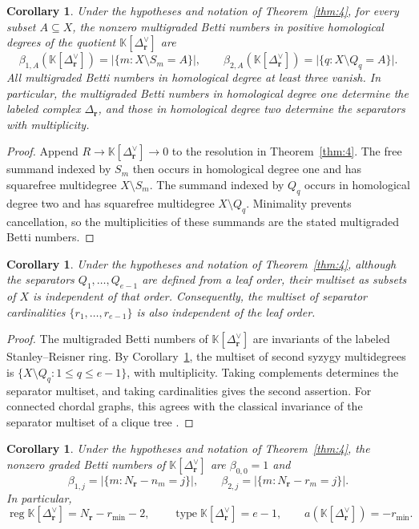 \documentclass[11pt]{amsart}
\newtheorem{corollary}[theorem]{Corollary}
\theoremstyle{definition}
\theoremstyle{remark}
\newcommand{\K}{\mathbb K}
\newcommand{\SR}[1]{\K[#1]}
\DeclareMathOperator{\reg}{reg}
\begin{document}
	\begin{corollary}\label{cor:7}
		Under the hypotheses and notation of Theorem~\ref{thm:4}, for every subset $A\subseteq X$, the nonzero multigraded Betti numbers in positive homological degrees of the quotient $\SR{\Delta_{\mathbf r}^\vee}$ are
		\[
		\beta_{1,A}(\SR{\Delta_{\mathbf r}^\vee})
		=
		\bigl|\{m:X\setminus S_m=A\}\bigr|,
		\qquad
		\beta_{2,A}(\SR{\Delta_{\mathbf r}^\vee})
		=
		\bigl|\{q:X\setminus Q_q=A\}\bigr|.
		\]
		All multigraded Betti numbers in homological degree at least three vanish. In particular, the multigraded Betti numbers in homological degree one determine the labeled complex $\Delta_{\mathbf r}$, and those in homological degree two determine the separators with multiplicity.
	\end{corollary}
	
	\begin{proof}
		Append $R\to\SR{\Delta_{\mathbf r}^\vee}\to0$ to the resolution in Theorem~\ref{thm:4}. The free summand indexed by $S_m$ then occurs in homological degree one and has squarefree multidegree $X\setminus S_m$. The summand indexed by $Q_q$ occurs in homological degree two and has squarefree multidegree $X\setminus Q_q$. Minimality prevents cancellation, so the multiplicities of these summands are the stated multigraded Betti numbers.
	\end{proof}
	
	\begin{corollary}\label{cor:8}
		Under the hypotheses and notation of Theorem~\ref{thm:4}, although the separators $Q_1,\ldots,Q_{e-1}$ are defined from a leaf order, their multiset as subsets of $X$ is independent of that order. Consequently, the multiset of separator cardinalities $\{r_1,\ldots,r_{e-1}\}$ is also independent of the leaf order.
	\end{corollary}
	
	\begin{proof}
		The multigraded Betti numbers of $\SR{\Delta_{\mathbf r}^\vee}$ are invariants of the labeled Stanley--Reisner ring. By Corollary~\ref{cor:7}, the multiset of second syzygy multidegrees is $\{X\setminus Q_q:1\le q\le e-1\}$, with multiplicity. Taking complements determines the separator multiset, and taking cardinalities gives the second assertion. For connected chordal graphs, this agrees with the classical invariance of the separator multiset of a clique tree \cite[Theorem~4.2]{BlairPeyton}.
	\end{proof}
	
	\begin{corollary}\label{cor:9}
		Under the hypotheses and notation of Theorem~\ref{thm:4}, the nonzero graded Betti numbers of $\SR{\Delta_{\mathbf r}^\vee}$ are $\beta_{0,0}=1$ and
		\[
		\beta_{1,j}=\bigl|\{m:N_{\mathbf r}-n_m=j\}\bigr|,
		\qquad
		\beta_{2,j}=\bigl|\{m:N_{\mathbf r}-r_m=j\}\bigr|.
		\]
		In particular,
		\[
		\reg\SR{\Delta_{\mathbf r}^\vee}=N_{\mathbf r}-r_{\min}-2,
		\qquad
		\operatorname{type}\SR{\Delta_{\mathbf r}^\vee}=e-1,
		\qquad
		a(\SR{\Delta_{\mathbf r}^\vee})=-r_{\min}.
		\]
	\end{corollary}
	
\end{document}
